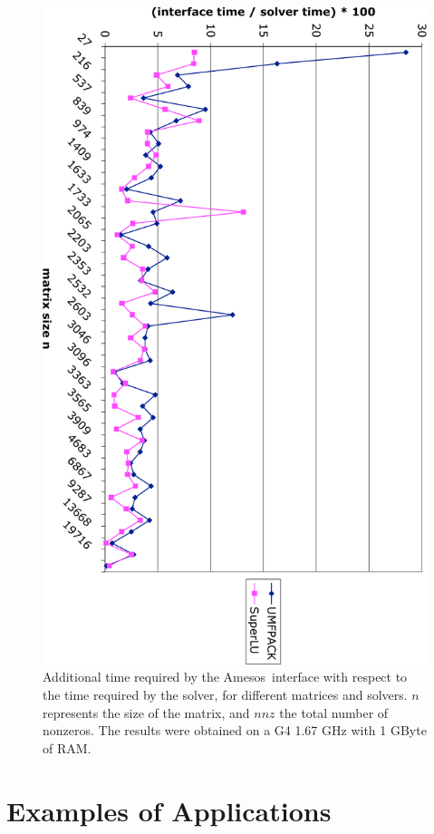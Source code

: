 \documentclass[acmtocl]{acmtrans2m}
\newcommand{\amesos}{{\sc Amesos}}
\begin{document}
\begin{figure}
\begin{center}
\includegraphics[angle=90,width=12cm]{interface_time.pdf}
\caption{Additional time required by the \amesos\ interface with respect to the
time required by the solver, for different matrices and solvers. $n$
  represents the size of the matrix, and $nnz$ the total number of nonzeros.
The results were obtained on a G4 1.67 GHz with 1 GByte of RAM.}
\label{fig:results}
\end{center}
\end{figure}

\section{Examples of Applications}
\label{sec:example}
\end{document}

